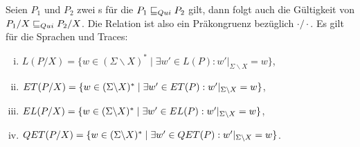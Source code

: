 \begin{Satz}
  \label{StilleHidingSatz}
  Seien $P_1$ und $P_2$ zwei \MEIO{}s für die $P_1 \sqsubseteq  _{Qui} P_2$ gilt, dann folgt
  auch die Gültigkeit von $P_1/X \sqsubseteq  _{Qui} P_2/X$. Die Relation \QRel{} ist also ein
  Präkongruenz bezüglich $\cdot /\cdot$. Es gilt für die Sprachen und Traces:
  \begin{enumerate}[(i)]
    \item $L(P/X) = \{w\in (\Sigma\backslash X)^*\mid \exists w'\in L(P):
      w'|_{\Sigma\backslash X} = w\}$,
    \item $ET (P/X) = \{w\in (\Sigma\backslash X)^*\mid \exists w'\in ET(P):
      w'|_{\Sigma\backslash X} = w\}$,
    \item $EL (P/X) = \{w\in (\Sigma\backslash X)^*\mid \exists w'\in EL(P):
      w'|_{\Sigma\backslash X} = w\}$,
    \item $QET (P/X) = \{w\in (\Sigma\backslash X)^*\mid \exists w'\in
      QET(P): w'|_{\Sigma\backslash X} = w\}$.
  \end{enumerate}
\end{Satz}
